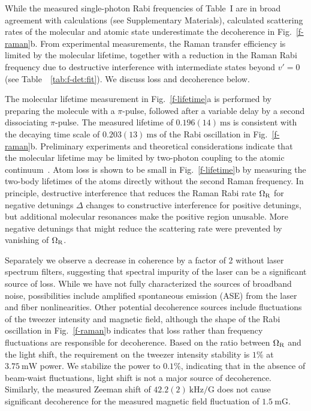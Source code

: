 \documentclass[aps,prx,twocolumn,10pt,superscriptaddress]{revtex4-2}
\begin{document}
While the measured single-photon Rabi frequencies of Table~I are in broad agreement with calculations (see Supplementary Materials), calculated scattering rates of the molecular and atomic state underestimate the decoherence in Fig.~\ref{f-raman}b.
From experimental measurements, the Raman transfer efficiency is limited by the molecular lifetime, together with a reduction in the Raman Rabi frequency due to destructive interference with intermediate states beyond $v'=0$ (see Table~~\ref{tab:f-det:fit}). We discuss loss and decoherence below.

The molecular lifetime measurement in Fig.~\ref{f-lifetime}a is performed
by preparing the molecule with a $\pi$-pulse,
followed after a variable delay by a second dissociating $\pi$-pulse. The measured lifetime of $0.196(14)~\mathrm{ms}$ is consistent with the decaying time scale of  $0.203(13)~\mathrm{ms}$ of the  Rabi oscillation
in Fig.~\ref{f-raman}b.
Preliminary experiments and theoretical considerations indicate that
the molecular lifetime may be limited by two-photon coupling
to the atomic continuum~\cite{YichaoYu}.
Atom loss is shown to be small in Fig.~\ref{f-lifetime}b
by measuring the two-body lifetimes of the atoms directly
without the second Raman frequency.
In principle, destructive interference that reduces the Raman Rabi rate $\Omega_{\rm R}$
for negative detunings $\Delta$ changes to constructive interference
for positive detunings, but additional molecular resonances make the positive region unusable.
More negative detunings that might reduce the scattering rate
were prevented by vanishing of $\Omega_{\rm R}$.

Separately we observe a decrease in coherence by a factor of 2 without laser spectrum filters,
suggesting that spectral impurity of the laser can be a significant source of loss. While we have not fully characterized the sources
of broadband noise, possibilities include amplified spontaneous emission (ASE) from the laser and fiber nonlinearities. Other potential decoherence sources include
fluctuations of the tweezer intensity and magnetic field, although the shape of the Rabi oscillation in Fig.~\ref{f-raman}b indicates that loss rather than frequency fluctuations are responsible for decoherence.
Based on the ratio between $\Omega_{\rm R}$ and the light shift,
the requirement on the tweezer intensity stability is $1\mathrm{\%}$ at $3.75~\mathrm{mW}$ power. We stabilize the power to $0.1\mathrm{\%}$, indicating that in the absence of beam-waist fluctuations, light shift is not a major source of decoherence.
Similarly, the measured Zeeman shift of $42.2(2)~\mathrm{kHz/G}$
does not cause significant decoherence for the measured magnetic field
fluctuation of $1.5~\mathrm{mG}$.
\end{document}
